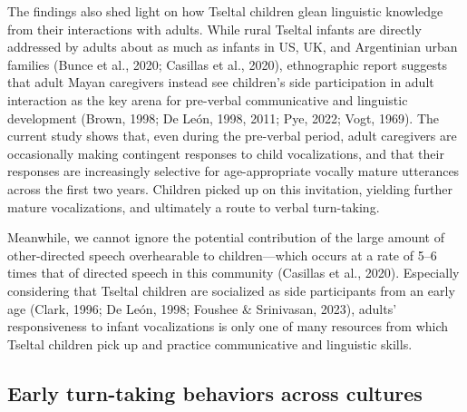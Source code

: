 \documentclass[
  man]{apa6}
\begin{document}
The findings also shed light on how Tseltal children glean linguistic knowledge from their interactions with adults. While rural Tseltal infants are directly addressed by adults about as much as infants in US, UK, and Argentinian urban families (Bunce et al., 2020; Casillas et al., 2020), ethnographic report suggests that adult Mayan caregivers instead see children's side participation in adult interaction as the key arena for pre-verbal communicative and linguistic development (Brown, 1998; De León, 1998, 2011; Pye, 2022; Vogt, 1969). The current study shows that, even during the pre-verbal period, adult caregivers are occasionally making contingent responses to child vocalizations, and that their responses are increasingly selective for age-appropriate vocally mature utterances across the first two years. Children picked up on this invitation, yielding further mature vocalizations, and ultimately a route to verbal turn-taking.

Meanwhile, we cannot ignore the potential contribution of the large amount of other-directed speech overhearable to children---which occurs at a rate of 5--6 times that of directed speech in this community (Casillas et al., 2020). Especially considering that Tseltal children are socialized as side participants from an early age (Clark, 1996; De León, 1998; Foushee \& Srinivasan, 2023), adults' responsiveness to infant vocalizations is only one of many resources from which Tseltal children pick up and practice communicative and linguistic skills.

\hypertarget{early-turn-taking-behaviors-across-cultures}{%
\subsection{Early turn-taking behaviors across cultures}\label{early-turn-taking-behaviors-across-cultures}}
\end{document}
